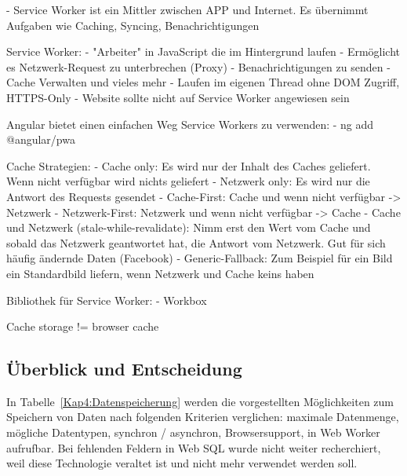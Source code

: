 - Service Worker ist ein Mittler zwischen APP und Internet. Es übernimmt Aufgaben wie Caching, Syncing, Benachrichtigungen \autocite{Sheppard2017}

Service Worker:
- "Arbeiter" in JavaScript die im Hintergrund laufen
- Ermöglicht es Netzwerk-Request zu unterbrechen (Proxy)
- Benachrichtigungen zu senden
- Cache Verwalten und vieles mehr
- Laufen im eigenen Thread ohne DOM Zugriff, HTTPS-Only
- Website sollte nicht auf Service Worker angewiesen sein
\autocite{Hajian2019}

Angular bietet einen einfachen Weg Service Workers zu verwenden:
- ng add @angular/pwa
\autocite{Hajian2019}

Cache Strategien:
- Cache only: Es wird nur der Inhalt des Caches geliefert. Wenn nicht verfügbar wird nichts geliefert
- Netzwerk only: Es wird nur die Antwort des Requests gesendet
- Cache-First: Cache und wenn nicht verfügbar -> Netzwerk
- Netzwerk-First: Netzwerk und wenn nicht verfügbar -> Cache
- Cache und Netzwerk (stale-while-revalidate): Nimm erst den Wert vom Cache und sobald das Netzwerk geantwortet hat, die Antwort vom Netzwerk. Gut für sich häufig ändernde Daten (Facebook)
- Generic-Fallback: Zum Beispiel für ein Bild ein Standardbild liefern, wenn Netzwerk und Cache keins haben
\autocite{Hajian2019} \autocite{Rojas2020}

Bibliothek für Service Worker:
- Workbox
\autocite{Rojas2020}

Cache storage != browser cache \autocite{Rojas2020}

\subsection{Überblick und Entscheidung}
In Tabelle~\ref{Kap4:Datenspeicherung} werden die vorgestellten Möglichkeiten zum Speichern von Daten nach folgenden Kriterien verglichen: maximale Datenmenge, mögliche Datentypen, synchron / asynchron, Browsersupport, in Web Worker aufrufbar. Bei fehlenden Feldern in Web SQL wurde nicht weiter recherchiert, weil diese Technologie veraltet ist und nicht mehr verwendet werden soll.

